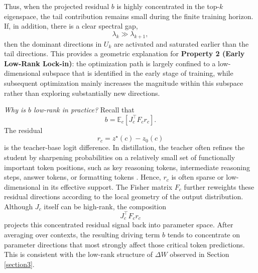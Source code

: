 \documentclass{llmxive}
\begin{document}
Thus, when the projected residual \(b\) is highly concentrated in the top-\(k\) eigenspace, the tail contribution remains small during the finite training horizon. If, in addition, there is a clear spectral gap,
\begin{equation}
\lambda_k \gg \lambda_{k+1},
\end{equation}
then the dominant directions in \(U_k\) are activated and saturated earlier than the tail directions. This provides a geometric explanation for \textbf{Property 2 (Early Low-Rank Lock-in)}: the optimization path is largely confined to a low-dimensional subspace that is identified in the early stage of training, while subsequent optimization mainly increases the magnitude within this subspace rather than exploring substantially new directions.

\emph{Why is \(b\) low-rank in practice?}
Recall that
\begin{equation}
b=\mathbb{E}_c[J_c^{\top}F_cr_c].
\end{equation}
The residual
\[
r_c=z^{\star}(c)-z_0(c)
\]
is the teacher-base logit difference. In distillation, the teacher often refines the student by sharpening probabilities on a relatively small set of functionally important token positions, such as key reasoning tokens, intermediate reasoning steps, answer tokens, or formatting tokens \citep{xu2026tip}. Hence, \(r_c\) is often sparse or low-dimensional in its effective support. The Fisher matrix \(F_c\) further reweights these residual directions according to the local geometry of the output distribution. Although \(J_c\) itself can be high-rank, the composition
\[
J_c^{\top}F_cr_c
\]
projects this concentrated residual signal back into parameter space. After averaging over contexts, the resulting driving term \(b\) tends to concentrate on parameter directions that most strongly affect those critical token predictions. This is consistent with the low-rank structure of \(\Delta W\) observed in Section \ref{section3}.
\end{document}
